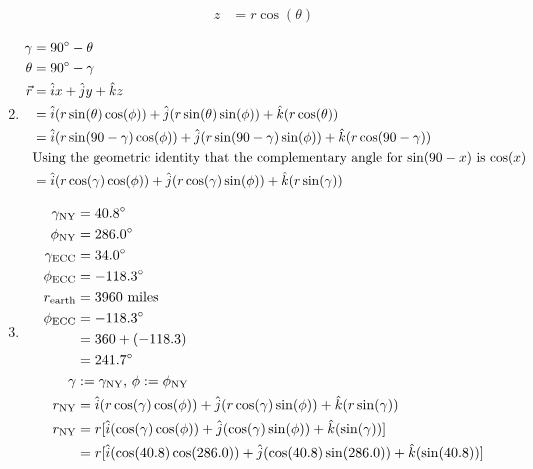 \documentclass{article}
\begin{document}
\begin{enumerate}[label=(\alph*)]
\begin{align*}
            z & = r\cos(\theta)
        \end{align*}
    \item
        \begin{align*}
            \gamma & = 90\degree - \theta \\
            \theta & = 90\degree - \gamma \\
            \vec{r} & = \hat{i}x + \hat{j}y + \hat{k}z \\
                    & = \hat{i}(r\sin(\theta)\cos(\phi)) + \hat{j}(r\sin(\theta)\sin(\phi)) + \hat{k}(r\cos(\theta)) \\
                    & = \hat{i}(r\sin(90 - \gamma)\cos(\phi)) + \hat{j}(r\sin(90 - \gamma)\sin(\phi)) + \hat{k}(r\cos(90 - \gamma)) \\
                    & \text{Using the geometric identity that the complementary angle for $ \sin(90 - x) $ is $ \cos(x) $} \\
                    & = \hat{i}(r\cos(\gamma)\cos(\phi)) + \hat{j}(r\cos(\gamma)\sin(\phi)) + \hat{k}(r\sin(\gamma)) \\
        \end{align*}
    \item
        \begin{align*}
            \gamma_{\text{NY}} & = 40.8\degree \\
            \phi_{\text{NY}} & = 286.0\degree \\
            \gamma_{\text{ECC}} & = 34.0\degree \\
            \phi_{\text{ECC}} & = -118.3\degree \\
            r_{\text{earth}} & = 3960 \text{ miles} \\
            \phi_{\text{ECC}} & = -118.3\degree \\
                              & = 360 + (-118.3) \\
                              & = 241.7\degree \\
            \gamma & := \gamma_{\text{NY}} \text{, } \phi := \phi_{\text{NY}} \\
            r_{\text{NY}} & = \hat{i}(r\cos(\gamma)\cos(\phi)) + \hat{j}(r\cos(\gamma)\sin(\phi)) + \hat{k}(r\sin(\gamma)) \\
            r_{\text{NY}} & = r[\hat{i}(\cos(\gamma)\cos(\phi)) + \hat{j}(\cos(\gamma)\sin(\phi)) + \hat{k}(\sin(\gamma))] \\
                          & = r[\hat{i}(\cos(40.8)\cos(286.0)) + \hat{j}(\cos(40.8)\sin(286.0)) + \hat{k}(\sin(40.8))] \\

\end{align*}
\end{enumerate}
\end{document}
